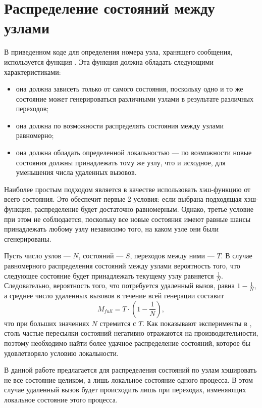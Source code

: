 \section{Распределение состояний между узлами}
\label{sec:state-partition}

В приведенном коде для определения номера узла, хранящего сообщения,
используется функция . Эта функция должна обладать следующими
характеристиками:

\begin{itemize}
\item она должна зависеть только от самого состояния, поскольку одно и
  то же состояние может генерироваться различными узлами в результате
  различных переходов;

\item она должна по возможности распределять состояния между узлами
  равномерно;

\item она должна обладать определенной локальностью — по возможности
  новые состояния должны принадлежать тому же узлу, что и исходное,
  для уменьшения числа удаленных вызовов.
\end{itemize}

Наиболее простым подходом является в качестве  использовать
хэш-функцию от всего состояния. Это обеспечит первые 2 условия: если
выбрана подходящая хэш-функция, распределение будет достаточно
равномерным. Однако, третье условие при этом не соблюдается, поскольку
все новые состояния имеют равные шансы принадлежать любому узлу
независимо того, на каком узле они были сгенерированы.

Пусть число узлов — $N$, состояний — $S$, переходов между ними —
$T$. В случае равномерного распределения состояний между узлами
вероятность того, что следующее состояние будет принадлежать текущему
узлу равняется $\frac{1}{N}$. Следовательно, вероятность того, что
потребуется удаленный вызов, равна $1 - \frac{1}{N}$, а среднее число
удаленных вызовов в течение всей генерации составит
\begin{equation}
  \label{eq:nmsg-full-hash}
  M_{full} = T \cdot (1 - \frac{1}{N}) ,
\end{equation}
что при больших значениях $N$ стремится с $T$. Как
показывают эксперименты в \cite{LT99}, столь частые пересылки
состояний негативно отражаются на производительности, поэтому
необходимо найти более удачное распределение состояний, которое бы
удовлетворяло условию локальности.

В данной работе предлагается для распределения состояний по узлам
хэшировать не все состояние целиком, а лишь локальное состояние одного
процесса. В этом случае удаленный вызов будет происходить лишь при
переходах, изменяющих локальное состояние этого процесса.

